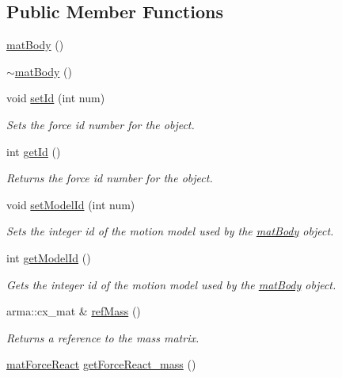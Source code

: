 \subsection*{Public Member Functions}
\begin{DoxyCompactItemize}
\item 
\hyperlink{classosea_1_1ofreq_1_1mat_body_adbcb73fc9873660ca781493b2b2742a2}{mat\-Body} ()
\item 
\hyperlink{classosea_1_1ofreq_1_1mat_body_afcc3a6a87689dfbb5dfa72648a46c355}{$\sim$mat\-Body} ()
\item 
void \hyperlink{classosea_1_1ofreq_1_1mat_body_abb86318fbd7300ed01eae308551f9e96}{set\-Id} (int num)
\begin{DoxyCompactList}\small\item\em Sets the force id number for the object. \end{DoxyCompactList}\item 
int \hyperlink{classosea_1_1ofreq_1_1mat_body_a551183ad56eeba71ea4690574b1841e4}{get\-Id} ()
\begin{DoxyCompactList}\small\item\em Returns the force id number for the object. \end{DoxyCompactList}\item 
void \hyperlink{classosea_1_1ofreq_1_1mat_body_abb8ea32c84153da5dfc53d7b0dc836a5}{set\-Model\-Id} (int num)
\begin{DoxyCompactList}\small\item\em Sets the integer id of the motion model used by the \hyperlink{classosea_1_1ofreq_1_1mat_body}{mat\-Body} object. \end{DoxyCompactList}\item 
int \hyperlink{classosea_1_1ofreq_1_1mat_body_ae4c339b7ce6a93cf6e54bc998cbd5903}{get\-Model\-Id} ()
\begin{DoxyCompactList}\small\item\em Gets the integer id of the motion model used by the \hyperlink{classosea_1_1ofreq_1_1mat_body}{mat\-Body} object. \end{DoxyCompactList}\item 
arma\-::cx\-\_\-mat \& \hyperlink{classosea_1_1ofreq_1_1mat_body_a7c0b44be2aa75ae270168849c06e6067}{ref\-Mass} ()
\begin{DoxyCompactList}\small\item\em Returns a reference to the mass matrix. \end{DoxyCompactList}\item 
\hyperlink{classosea_1_1ofreq_1_1mat_force_react}{mat\-Force\-React} \hyperlink{classosea_1_1ofreq_1_1mat_body_a761cb2a473d3af200aa79a1c199c1bf2}{get\-Force\-React\-\_\-mass} ()

\end{DoxyCompactItemize}
